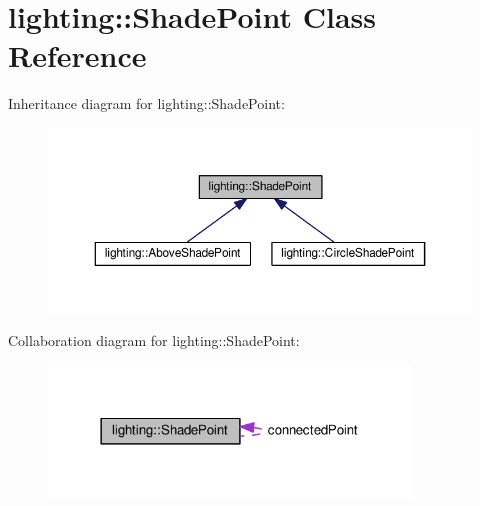 \hypertarget{classlighting_1_1ShadePoint}{}\section{lighting\+:\+:Shade\+Point Class Reference}
\label{classlighting_1_1ShadePoint}


Inheritance diagram for lighting\+:\+:Shade\+Point\+:\nopagebreak
\begin{figure}[H]
\begin{center}
\leavevmode
\includegraphics[width=350pt]{classlighting_1_1ShadePoint__inherit__graph}
\end{center}
\end{figure}


Collaboration diagram for lighting\+:\+:Shade\+Point\+:\nopagebreak
\begin{figure}[H]
\begin{center}
\leavevmode
\includegraphics[width=273pt]{classlighting_1_1ShadePoint__coll__graph}
\end{center}
\end{figure}
